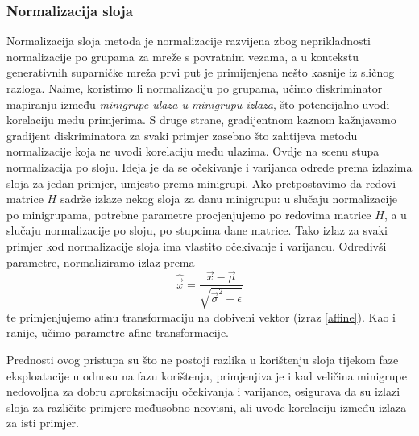 \subsubsection{Normalizacija sloja}
Normalizacija sloja \citep{ba2016layer} metoda je normalizacije razvijena zbog neprikladnosti normalizacije po grupama za mreže s povratnim vezama, a u kontekstu generativnih suparničke mreža prvi put je primijenjena nešto kasnije \citep{gulrajani2017improved} iz sličnog razloga. Naime, koristimo li normalizaciju po grupama, učimo diskriminator mapiranju između \textit{minigrupe ulaza u minigrupu izlaza}, što potencijalno uvodi korelaciju među primjerima. S druge strane, gradijentnom kaznom kažnjavamo gradijent diskriminatora za svaki primjer zasebno što zahtijeva metodu normalizacije koja ne uvodi korelaciju među ulazima. Ovdje na scenu stupa normalizacija po sloju. Ideja je da se očekivanje i varijanca odrede prema izlazima sloja za jedan primjer, umjesto prema minigrupi. Ako pretpostavimo da redovi matrice $H$ sadrže izlaze nekog sloja za danu minigrupu: u slučaju normalizacije po minigrupama, potrebne parametre procjenjujemo po redovima matrice $H$, a u slučaju normalizacije po sloju, po stupcima dane matrice. Tako izlaz za svaki primjer kod normalizacije sloja ima vlastito očekivanje i varijancu. Odredivši parametre, normaliziramo izlaz prema
\begin{equation}
\hat{\vec{x}} = \frac{\vec{x} - \vec{\mu}}{\sqrt{\vec{\sigma}^2 + \epsilon}}
\end{equation}
te primjenjujemo afinu transformaciju na dobiveni vektor (izraz \ref{affine}). Kao i ranije, učimo parametre afine transformacije.

Prednosti ovog pristupa su što ne postoji razlika u korištenju sloja tijekom faze eksploatacije u odnosu na fazu korištenja, primjenjiva je i kad veličina minigrupe nedovoljna za dobru aproksimaciju očekivanja i varijance, osigurava da su izlazi sloja za različite primjere međusobno neovisni, ali uvode korelaciju između izlaza za isti primjer.